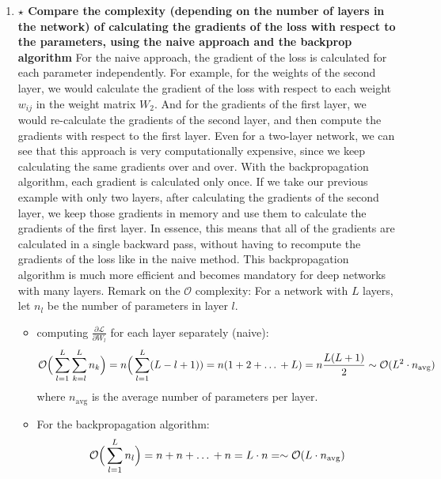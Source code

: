 \documentclass[12pt,a4paper]{article}
\begin{document}
\begin{enumerate}[resume]
    \item \textbf{$\star$ Compare the complexity (depending on the number of layers in the network) of calculating the
            gradients of the loss with respect to the parameters, using the naive approach and the backprop algorithm} \newline
    For the naive approach, the gradient of the loss is calculated for each parameter independently. 
    For example, for the weights of the second layer, we would calculate the gradient of the loss with respect to each weight $w_{ij}$ in 
    the weight matrix $W_2$. And for the gradients of the first layer, we would re-calculate the gradients of the second layer, 
    and then compute the gradients with respect to the first layer. Even for a two-layer network, we can see that this approach is very computationally 
    expensive, since we keep calculating the same gradients over and over. \newline
    With the backpropagation algorithm, each gradient is calculated only once. If we take our previous example with only two layers, 
    after calculating the gradients of the second layer, we keep those gradients in memory and use them to calculate the gradients of the first layer. 
    In essence, this means that all of the gradients are calculated in a single backward pass, 
    without having to recompute the gradients of the loss like in the naive method. \newline
    This backpropagation algorithm is much more efficient and becomes mandatory for deep networks with many layers. \newline
    Remark on the $\mathcal{O}$ complexity: \newline
    For a network with $L$ layers, let $n_l$ be the number of parameters in layer $l$.  

    \begin{itemize}
        \item computing $\frac{\partial \mathcal{L}}{\partial W_l}$ for each layer separately (naive):  
        \[
        \mathcal{O}\Big(\sum_{l=1}^L \sum_{k=l}^L n_k\Big) = n \Big(\sum_{l=1}^{L} (L - l + 1)) = n(1 + 2 + \text{\dots} + L) = n \frac{L(L+1)}{2}
        \sim \mathcal{O}(L^2 \cdot n_\text{avg})
        \]  
        where $n_\text{avg}$ is the average number of parameters per layer.  

        \item For the backpropagation algorithm:  
        \[
        \mathcal{O}\Big(\sum_{l=1}^L n_l\Big) = n + n + \text{\dots} + n = L \cdot n  = \sim \mathcal{O}(L \cdot n_\text{avg})
        \]  
    \end{itemize}


\end{enumerate}
\end{document}
